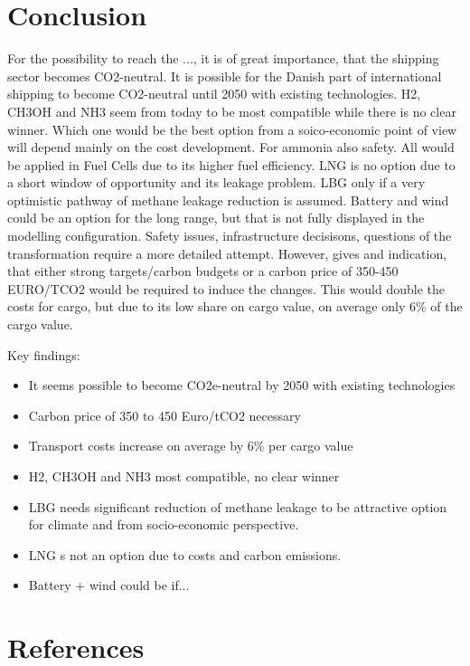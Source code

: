 \documentclass[article]{elsarticle}
\begin{document}
\section{Conclusion}
For the possibility to reach the ..., it is of great importance, that the shipping sector becomes CO2-neutral. It is possible for the Danish part of international shipping to become CO2-neutral until 2050 with existing technologies. H2, CH3OH and NH3 seem from today to be most compatible while there is no clear winner. Which one would be the best option from a soico-economic point of view will depend mainly on the cost development. For ammonia also safety. All would be applied in Fuel Cells due to its higher fuel efficiency. LNG is no option due to a short window of opportunity and its leakage problem. LBG only if a very optimistic pathway of methane leakage reduction is assumed. Battery and wind could be an option for the long range, but that is not fully displayed in the modelling configuration. Safety issues, infrastructure decisisons, questions of the transformation require a more detailed attempt.
However, gives and indication, that either strong targets/carbon budgets or a carbon price of 350-450 EURO/TCO2 would be required to induce the changes. This would double the costs for cargo, but due to its low share on cargo value, on average only 6\% of the cargo value.

Key findings:
\begin{itemize}
    \item It seems possible to become CO2e-neutral by 2050 with existing technologies
    \item Carbon price of 350 to 450 Euro/tCO2 necessary
    \item Transport costs increase on average by 6\% per cargo value
    \item H2, CH3OH and NH3 most compatible, no clear winner
    \item LBG needs significant reduction of methane leakage to be attractive option for climate and from socio-economic perspective.
    \item LNG s not an option due to costs and carbon emissions.
    \item Battery + wind could be if...
\end{itemize}

\section*{References}


\end{document}
